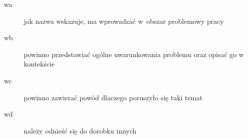 \documentclass[brudnopis]{xmgr}
\begin{document}
\maketitle
%
\introduction

\begin{description}
\item[wa] \textcolor{wa}{jak nazwa wskazuje, ma wprowadzać
  w~obszar problemowy pracy}
\item[wb] \textcolor{wb}{powinno przedstawiać ogólne
  uwarunkowania problemu oraz opisać go w kontekście}
\item[wc] \textcolor{wc}{powinno zawierać powód dlaczego
  poruszyło się taki temat}
\item[wd] \textcolor{wd}{należy odnieść się do dorobku innych}
\end{description}
\end{document}
